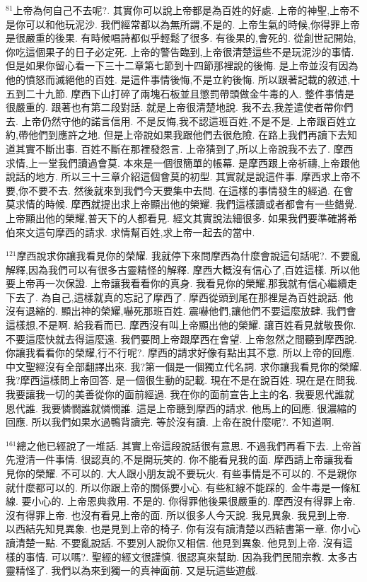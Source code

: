 \documentclass{book}
\begin{document}
$^{81}$上帝為何自己不去呢?.
其實你可以說上帝都是為百姓的好處.
上帝的神聖,上帝不是你可以和他玩泥沙.
我們經常都以為無所謂,不是的.
上帝生氣的時候,你得罪上帝是很嚴重的後果.
有時候唱詩都似乎輕鬆了很多.
有後果的,會死的.
從創世記開始,你吃這個果子的日子必定死.
上帝的警告臨到,上帝很清楚這些不是玩泥沙的事情.
但是如果你留心看一下三十二章第七節到十四節那裡說的後悔.
是上帝並沒有因為他的憤怒而滅絕他的百姓.
是這件事情後悔,不是立約後悔.
所以跟著記載的敘述,十五到二十九節.
摩西下山打碎了兩塊石板並且懲罰帶頭做金牛毒的人.
整件事情是很嚴重的.
跟著也有第二段對話.
就是上帝很清楚地說.
我不去,我差遣使者帶你們去.
上帝仍然守他的諾言信用.
不是反悔,我不認這班百姓,不是不是.
上帝跟百姓立約,帶他們到應許之地.
但是上帝說如果我跟他們去很危險.
在路上我們再讀下去知道其實不斷出事.
百姓不斷在那裡發怨言.
上帝猜到了,所以上帝說我不去了.
摩西求情,上一堂我們讀過會莫.
本來是一個很簡單的帳幕.
是摩西跟上帝祈禱,上帝跟他說話的地方.
所以三十三章介紹這個會莫的初型.
其實就是說這件事.
摩西求上帝不要,你不要不去.
然後就來到我們今天要集中去問.
在這樣的事情發生的經過.
在會莫求情的時候.
摩西就提出求上帝顯出他的榮耀.
我們這樣讀或者都會有一些錯覺.
上帝顯出他的榮耀,普天下的人都看見.
經文其實說法細很多.
如果我們要準確將希伯來文這句摩西的請求.
求情幫百姓,求上帝一起去的當中.

$^{121}$摩西說求你讓我看見你的榮耀.
我就停下來問摩西為什麼會說這句話呢?.
不要亂解釋,因為我們可以有很多古靈精怪的解釋.
摩西大概沒有信心了,百姓這樣.
所以他要上帝再一次保證.
上帝讓我看看你的真身.
我看見你的榮耀,那我就有信心繼續走下去了.
為自己,這樣就真的忘記了摩西了.
摩西從頭到尾在那裡是為百姓說話.
他沒有退縮的.
顯出神的榮耀,嚇死那班百姓.
震嚇他們,讓他們不要這麼放肆.
我們會這樣想,不是啊.
給我看而已.
摩西沒有叫上帝顯出他的榮耀.
讓百姓看見就敬畏你.
不要這麼快就去得這麼遠.
我們要問上帝跟摩西在會望.
上帝忽然之間聽到摩西說.
你讓我看看你的榮耀,行不行呢?.
摩西的請求好像有點出其不意.
所以上帝的回應.
中文聖經沒有全部翻譯出來.
我?第一個是一個獨立代名詞.
求你讓我看見你的榮耀.
我?摩西這樣問上帝回答.
是一個很生動的記載.
現在不是在說百姓.
現在是在問我.
我要讓我一切的美善從你的面前經過.
我在你的面前宣告上主的名.
我要恩代誰就恩代誰.
我要憐憫誰就憐憫誰.
這是上帝聽到摩西的請求.
他馬上的回應.
很濃縮的回應.
所以我們如果水過鴨背讀完.
等於沒有讀.
上帝在說什麼呢?.
不知道啊.

$^{161}$總之他已經說了一堆話.
其實上帝這段說話很有意思.
不過我們再看下去.
上帝首先澄清一件事情.
很認真的,不是開玩笑的.
你不能看見我的面.
摩西請上帝讓我看見你的榮耀.
不可以的.
大人跟小朋友說不要玩火.
有些事情是不可以的.
不是親你就什麼都可以的.
所以你跟上帝的關係要小心.
有些紅線不能踩的.
金牛毒是一條紅線.
要小心的.
上帝恩典救用.
不是的.
你得罪他後果很嚴重的.
摩西沒有得罪上帝.
沒有得罪上帝.
也沒有看見上帝的面.
所以很多人今天說.
我見異象.
我見到上帝.
以西結先知見異象.
也是見到上帝的椅子.
你有沒有讀清楚以西結書第一章.
你小心讀清楚一點.
不要亂說話.
不要別人說你又相信.
他見到異象.
他見到上帝.
沒有這樣的事情.
可以嗎?.
聖經的經文很謹慎.
很認真來幫助.
因為我們民間宗教.
太多古靈精怪了.
我們以為來到獨一的真神面前.
又是玩這些遊戲.
\end{document}
